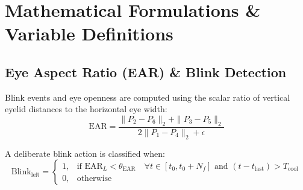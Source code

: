 \documentclass[11pt,a4paper]{article}
\begin{document}
\section{Mathematical Formulations \& Variable Definitions}

\subsection{Eye Aspect Ratio (EAR) \& Blink Detection}
Blink events and eye openness are computed using the scalar ratio of vertical eyelid distances to the horizontal eye width:
\begin{equation}
\text{EAR} = \frac{\|P_2 - P_6\|_2 + \|P_3 - P_5\|_2}{2 \|P_1 - P_4\|_2 + \epsilon}
\end{equation}

A deliberate blink action is classified when:
\begin{equation}
\text{Blink}_{\text{left}} = 
\begin{cases}
1, & \text{if } \text{EAR}_L < \theta_{\text{EAR}} \quad \forall t \in [t_0, t_0 + N_f] \text{ and } (t - t_{\text{last}}) > T_{\text{cool}} \\
0, & \text{otherwise}
\end{cases}
\end{equation}
\end{document}
